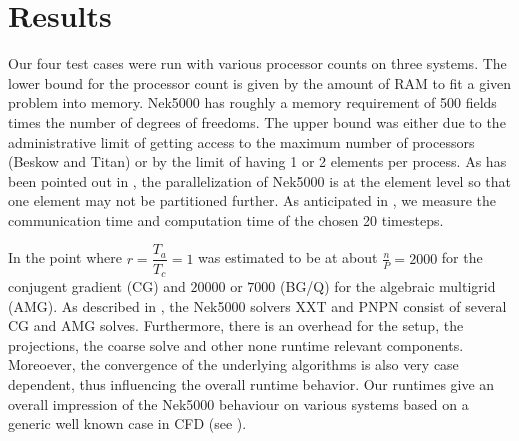 \documentclass{sig-alternate}
\begin{document}
\section{Results}

Our four test cases were run with various processor counts on three systems. The
lower bound for the processor count is given by the amount of RAM to fit a given
problem into memory. Nek5000 has roughly a memory requirement of 500 fields
times the number of degrees of freedoms. The upper bound was either due to the
administrative limit of getting access to the maximum number of processors
(Beskow and Titan) or by the limit of having 1 or 2 elements per process. As has
been pointed out in , the parallelization of Nek5000 is at the
element level so that one element may not be partitioned further. 
As anticipated in , we measure the communication time and
computation time of the chosen 20 timesteps. 

In \cite{fischer:scaling} the point where $r=\dfrac{T_a}{T_c}=1$ was estimated
to be at about $\frac{n}{P}=2000$ for the conjugent gradient (CG) and $20000$ or
$7000$ (BG/Q) for the algebraic multigrid (AMG). As described in , the
Nek5000 solvers XXT and PNPN consist of several CG and AMG solves. Furthermore,
there is an overhead for the setup, the projections, the coarse solve and other
none runtime relevant components. Moreoever, the convergence of the underlying
algorithms is also very case dependent, thus influencing the overall runtime
behavior. Our runtimes give an overall impression of the Nek5000 behaviour on
various systems based on a generic well known case in CFD (see
). 
\end{document}
